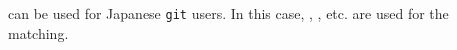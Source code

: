 \documentclass[manuscript,anonymous,review]{acmart}
\def\GIT{\texttt{git}}
\begin{document}
\begin{quote}
\end{quote}
  
can be used for Japanese {\GIT} users.
In this case,
,
, etc.
are used for the matching.

\end{document}

